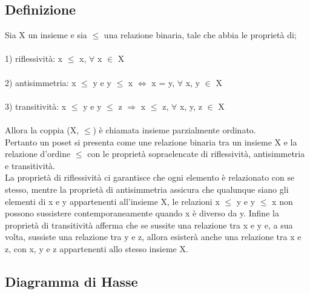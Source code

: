 \documentclass[12pt]{article}
\begin{document}
\subsection{Definizione}

Sia X un insieme e sia $\leq$ una relazione binaria, tale che abbia le proprietà di;\\
\\
1) riflessività: x $\leq$ x, $\forall$ x $\in$ X\\
\\
2) antisimmetria: x $\leq$ y e y $\leq$ x $\Leftrightarrow$ x = y, $\forall$ x, y $\in$ X \\
\\
3) transitività: x $\leq$ y e y $\leq$ z $\Rightarrow$ x $\leq$ z, $\forall$ x, y, z $\in$ X\\
\\
Allora la coppia (X, $\leq$) è chiamata insieme parzialmente ordinato. \\
Pertanto un poset si presenta come une relazione binaria tra un insieme X e la relazione d'ordine 
$\leq$  con le proprietà sopraelencate di riflessività, antisimmetria e transitività.\\
La proprietà di riflessività ci garantisce che ogni elemento è relazionato con se stesso, 
mentre la proprietà di antisimmetria assicura che qualunque siano gli elementi di x e y 
appartenenti all'insieme X, le relazioni  x $\leq$ y e y $\leq$ x non possono sussistere 
contemporaneamente quando x è diverso da y. Infine la proprietà di transitività afferma che 
se sussite una relazione tra x e y e, a sua volta, sussiste una relazione tra y e z, allora 
esisterà anche una relazione tra x e z, con x, y e z appartenenti allo stesso insieme X. 



\subsection{Diagramma di Hasse}
\end{document}
